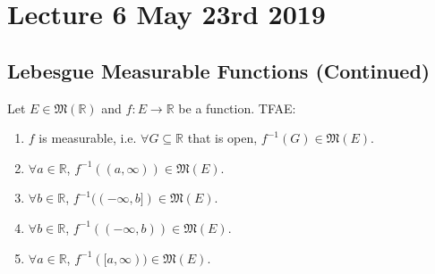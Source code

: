 \documentclass[notoc,notitlepage]{tufte-book}
\begin{document}


\chapter{Lecture 6 May 23rd 2019}%
\label{chp:lecture_6_may_23rd_2019}

\section{Lebesgue Measurable Functions (Continued)}%
\label{sec:lebesgue_measurable_functions_continued}

\begin{propo}\label{propo:function_measurability_check}
  Let $E \in \mathfrak{M}(\mathbb{R})$ and $f : E \to \mathbb{R}$ be a function.
  TFAE:
  \begin{enumerate}
    \item $f$ is measurable, i.e. $\forall G \subseteq \mathbb{R}$ that is open,
      $ f^{-1}(G) \in \mathfrak{M}(E)$.
    \item $\forall a \in \mathbb{R}$, $f^{-1}((a, \infty)) \in \mathfrak{M}(E)$.
    \item $\forall b \in \mathbb{R}$, $f^{-1}((-\infty, b]) \in
      \mathfrak{M}(E)$.
    \item $\forall b \in \mathbb{R}$, $f^{-1}((-\infty, b)) \in
      \mathfrak{M}(E)$.
    \item $\forall a \in \mathbb{R}$, $f^{-1}([a, \infty)) \in \mathfrak{M}(E)$.
  \end{enumerate}
\end{propo}
\end{document}
